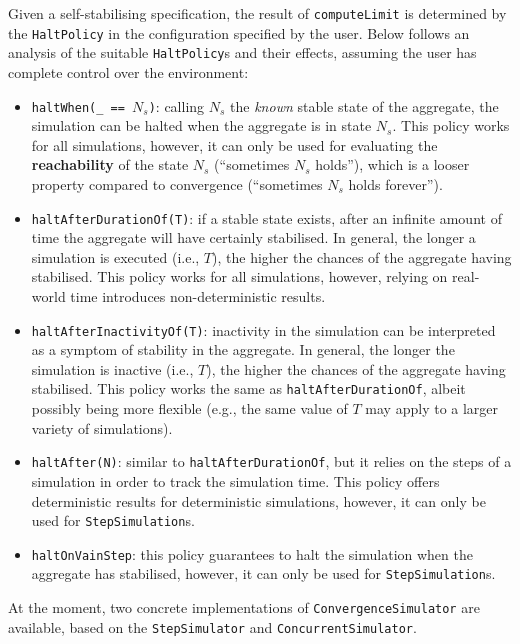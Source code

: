 Given a self-stabilising specification, the result of \texttt{computeLimit} is
determined by the \texttt{HaltPolicy} in the configuration specified by the
user. Below follows an analysis of the suitable \texttt{HaltPolicy}s and their
effects, assuming the user has complete control over the environment:
\begin{itemize}
  \item \texttt{haltWhen(\_ == $N_s$)}: calling $N_s$ the \textit{known} stable
        state of the aggregate, the simulation can be halted when the aggregate
        is in state $N_s$. This policy works for all simulations, however, it
        can only be used for evaluating the \textbf{reachability} of the state
        $N_s$ (\enquote{sometimes $N_s$ holds}), which is a looser property
        compared to convergence (\enquote{sometimes $N_s$ holds forever}).
  \item \texttt{haltAfterDurationOf(T)}: if a stable state exists, after an
        infinite amount of time the aggregate will have certainly stabilised.
        In general, the longer a simulation is executed (i.e., $T$), the
        higher the chances of the aggregate having stabilised. This policy
        works for all simulations, however, relying on real-world time
        introduces non-deterministic results.
  \item \texttt{haltAfterInactivityOf(T)}: inactivity in the simulation can be
        interpreted as a symptom of stability in the aggregate. In general,
        the longer the simulation is inactive (i.e., $T$), the higher the
        chances of the aggregate having stabilised. This policy works the same
        as \texttt{haltAfterDurationOf}, albeit possibly being more flexible
        (e.g., the same value of $T$ may apply to a larger variety of
        simulations).
  \item \texttt{haltAfter(N)}: similar to \texttt{haltAfterDurationOf}, but it
        relies on the steps of a simulation in order to track the simulation
        time. This policy offers deterministic results for deterministic
        simulations, however, it can only be used for \texttt{StepSimulation}s.
  \item \texttt{haltOnVainStep}: this policy guarantees to halt the simulation
        when the aggregate has stabilised, however, it can only be used for
        \texttt{StepSimulation}s.
\end{itemize}

At the moment, two concrete implementations of \texttt{ConvergenceSimulator}
are available, based on the \texttt{StepSimulator} and
\texttt{ConcurrentSimulator}.

